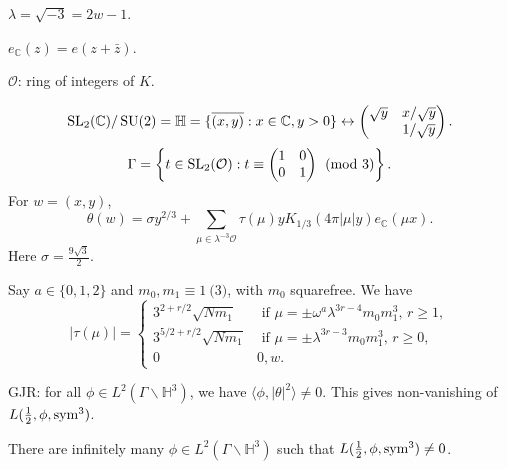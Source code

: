 \documentclass[reqno]{amsart} 
\begin{document}
$\lambda = \sqrt{- 3} = 2 w - 1$.

$e_{\mathbb{C}}(z) = e(z + \bar{z})$.

$\mathcal{O}$: ring of integers of $K$.

\begin{equation*}
  \operatorname{SL}_2(\mathbb{C}) / \operatorname{SU}(2) = \mathbb{H} = \{\overline{(x, y)} : x \in \mathbb{C}, y > 0\}
  \leftrightarrow
  \begin{pmatrix}
    \sqrt{y} &  x /\sqrt{y} \\
             & 1/\sqrt{y} \\
  \end{pmatrix}.
\end{equation*}
\begin{equation*}
\Gamma = \left\{ t \in \operatorname{SL}_2(\mathcal{O}) : t \equiv
  \begin{pmatrix}
1 & 0 \\
0 & 1 \\
\end{pmatrix} \pmod{3} \right\}.
\end{equation*}
For $w =(x, y)$,
\begin{equation*}
  \theta(w) = \sigma y^{2/3} + \sum_{\mu \in \lambda^{- 3} \mathcal{O}}
  \tau(\mu) y K_{1/3} \left( 4 \pi \lvert \mu  \rvert y \right) e_{\mathbb{C}}(\mu x).
\end{equation*}
Here $\sigma = \frac{9 \sqrt{3}}{2}$.

Say $a \in \{0,1,2\}$ and $m_0, m_1 \equiv 1 \pod{3}$, with $m_0$ squarefree.
We have
\begin{equation*}
  \lvert \tau(\mu ) \rvert =
  \begin{cases}
    3^{2 + r /2} \sqrt{N m_1}    & \text{ if } \mu = \pm \omega^a \lambda^{3 r - 4} m_0 m_1^3, \, r \geq 1, \\
    3^{5/2 + r/2} \sqrt{N m_1}                                 & \text{ if } \mu = \pm \lambda^{3 r - 3} m_0 m_1^3, \, r \geq 0, \\
    0                                & 0, w.  
  \end{cases}
\end{equation*}

GJR: for all $\phi \in L^2(\Gamma \backslash \mathbb{H}^3)$, we have $\langle \phi, \lvert \theta  \rvert^2  \rangle \neq 0$.  This gives non-vanishing of $L(\tfrac{1}{2}, \phi, \operatorname{sym}^3)$.

\begin{theorem}
  There are infinitely many $\phi \in L^2(\Gamma \backslash \mathbb{H} ^3)$ such that $L(\tfrac{1}{2}, \phi, \operatorname{sym}^3) \neq 0$.
\end{theorem}
\end{document}

